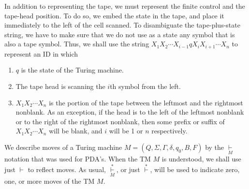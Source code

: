 \documentclass[]{article}
\begin{document}
    In addition to representing the tape, we must represent the finite control 
    and the tape-head position. To do so, we embed the state in the tape, and 
    place it immediately to the left of the cell scanned. To disambiguate the 
    tape-plus-state string, we have to make sure that we do not use as a state 
    any symbol that is also a tape symbol. Thus, we shall use the string 
    $X_1X_2\cdots{}X_{i-1}qX_iX_{i+1}\cdots{}X_n$ to represent an ID in which
      \begin{enumerate}
        \item $q$ is the state of the Turing machine.
        \item The tape head is scanning the $i$th symbol from the left.
        \item $X_1X_2\cdots{}X_n$ is the portion of the tape between the 
        leftmost and the rightmost nonblank. As an exception, if the head is to 
        the left of the leftmost nonblank or to the right of the rightmost 
        nonblank, then some prefix or suffix of $X_1X_2\cdots{}X_n$ will be 
        blank, and $i$ will be 1 or $n$ respectively.
      \end{enumerate}
      
    We describe moves of a Turing machine 
    $M = (Q,\Sigma,\Gamma,\delta,q_0,B,F)$ by the $\underset{M}{\vdash}$ 
    notation that was used for PDA's. When the TM $M$ is understood, we shall 
    use just $\vdash$ to reflect moves. As usual, 
    $\overset{*}{\underset{M}{\vdash}}$, or just $\overset{*}{\vdash}$, will be
    used to indicate zero, one, or more moves of the TM $M$.
    
\end{document}

